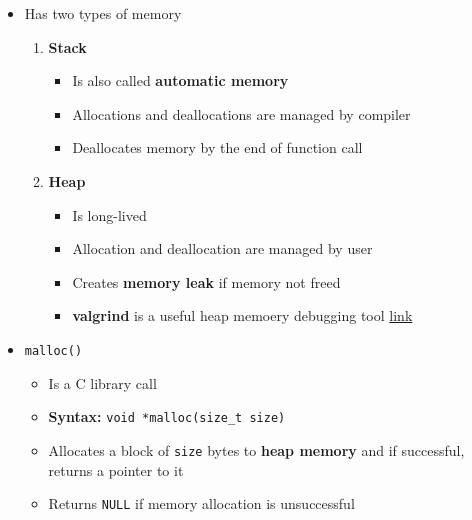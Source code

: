 \documentclass[12pt]{article}
\begin{document}
\begin{enumerate}[1.]
\begin{enumerate}[a)]
\begin{itemize}
            \begin{itemize}
                \item Has two types of memory

                \begin{enumerate}[1.]
                    \item \textbf{Stack}

                    \begin{itemize}
                        \item Is also called \textbf{automatic memory}
                        \item Allocations and deallocations are managed by compiler
                        \item Deallocates memory by the end of function call
                    \end{itemize}

                    \item \textbf{Heap}

                    \begin{itemize}
                        \item Is long-lived
                        \item Allocation and deallocation are managed by user
                        \item Creates \textbf{memory leak} if memory not freed
                        \item \textbf{valgrind} is a useful heap memoery debugging tool \href{https://www.valgrind.org/docs/manual/quick-start.html}{link}
                    \end{itemize}
                \end{enumerate}

                \item \texttt{malloc()}
                \begin{itemize}
                    \item Is a C library call
                    \item \textbf{Syntax:} \texttt{void *malloc(size\_t size)}
                    \item Allocates a block of \texttt{size} bytes to \textbf{heap memory}
                    and if successful, returns a pointer to it
                    \item Returns \texttt{NULL} if memory allocation is unsuccessful
                \end{itemize}


\end{itemize}
\end{itemize}
\end{enumerate}
\end{enumerate}
\end{document}
